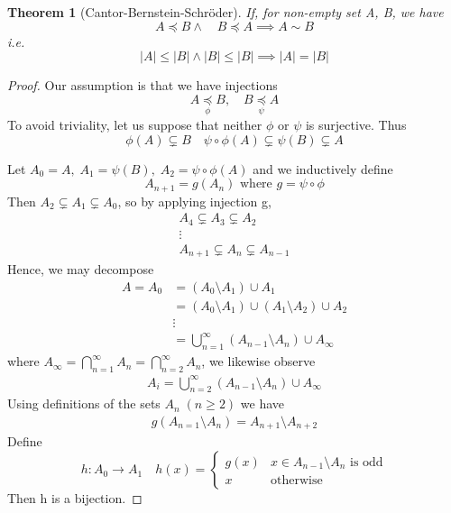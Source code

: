 \documentclass[11pt, oneside]{book}
\theoremstyle{break}
\newtheorem{thm}{Theorem}[section]
\newtheorem*{proof}{Proof}
\begin{document}
\begin{thm}[Cantor-Bernstein-Schröder]
	\label{thm:CBS}
	If, for non-empty set A, B, we have
	\begin{equation}
		A \preceq B \land \quad B \preceq A \implies A \sim B
	\end{equation}
	i.e.
	\begin{equation}
		|A| \leq |B| \land |B| \leq |B| \implies |A| = |B|
	\end{equation}
\end{thm}

\begin{proof}
	Our assumption is that we have injections
	\begin{equation}
		A \underset{\phi}{\preceq} B, \quad B \underset{\psi}{\preceq} A
	\end{equation}
	To avoid triviality, let us suppose that neither $\phi$ or $\psi$ is surjective. Thus
	\begin{equation}
		\phi(A) \subsetneq B \quad \psi \circ \phi(A) \subsetneq \psi(B) \subsetneq A
	\end{equation}

	Let $A_0 = A, \; A_1 = \psi(B), \; A_2 = \psi \circ \phi(A)$ and we inductively define
	\begin{equation}
		A_{n + 1} = g(A_n) \text{ where } g = \psi \circ \phi
	\end{equation}
	Then $A_2 \subsetneq A_1 \subsetneq A_0$, so by applying injection g,
	\begin{gather*}
		A_4 \subsetneq A_3 \subsetneq A_2 \\
		\vdots \\
		A_{n + 1} \subsetneq A_n \subsetneq A_{n - 1}
	\end{gather*}
	Hence, we may decompose
	\begin{align*}
		A = A_0 &= (A_0 \setminus A_1) \cup A_1 \\
				&= (A_0 \setminus A_1) \cup (A_1 \setminus A_2) \cup A_2 \\
				& \vdots \\
				&= \bigcup_{n = 1}^\infty (A_{n-1} \setminus A_n) \cup A_\infty
	\end{align*}
	where $A_\infty = \bigcap_{n = 1}^\infty A_n = \bigcap_{n = 2}^\infty A_n$, we likewise observe
	\begin{align*}
		A_i = \bigcup_{n = 2}^\infty (A_{n-1} \setminus A_n) \cup A_\infty
	\end{align*}
	Using definitions of the sets $A_n \; (n \geq 2)$ we have
	\begin{align*}
		g(A_{n=1} \setminus A_n) = A_{n+1} \setminus A_{n + 2}
	\end{align*}
	Define
	\begin{equation}
		h : A_0 \to A_1 \quad h(x) = 
		\begin{cases}
			g(x) & x \in A_{n - 1} \setminus A_n \text{ is odd} \\
			x & \text{otherwise}
		\end{cases}
	\end{equation}
	Then h is a bijection.


\end{proof}
\end{document}
